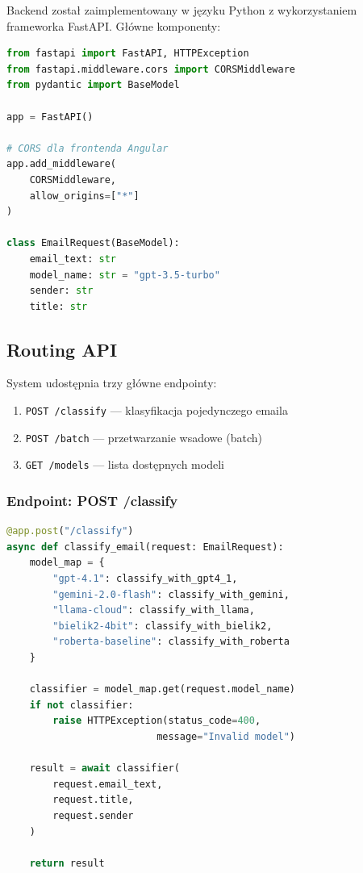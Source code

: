 \documentclass[11pt]{extreport}
\begin{document}
Backend został zaimplementowany w języku Python z wykorzystaniem frameworka FastAPI. Główne komponenty:

\begin{lstlisting}[language=Python, caption={Główny plik backendu}, label={lst:main}]
from fastapi import FastAPI, HTTPException
from fastapi.middleware.cors import CORSMiddleware
from pydantic import BaseModel

app = FastAPI()

# CORS dla frontenda Angular
app.add_middleware(
    CORSMiddleware, 
    allow_origins=["*"]
)

class EmailRequest(BaseModel):
    email_text: str
    model_name: str = "gpt-3.5-turbo"
    sender: str
    title: str
\end{lstlisting}

\subsection{Routing API}

System udostępnia trzy główne endpointy:

\begin{enumerate}
    \item \texttt{POST /classify} --- klasyfikacja pojedynczego emaila
    \item \texttt{POST /batch} --- przetwarzanie wsadowe (batch)
    \item \texttt{GET /models} --- lista dostępnych modeli
\end{enumerate}

\subsubsection{Endpoint: POST /classify}

\begin{lstlisting}[language=Python, caption={Endpoint klasyfikacji}, label={lst:classify}]
@app.post("/classify")
async def classify_email(request: EmailRequest):
    model_map = {
        "gpt-4.1": classify_with_gpt4_1,
        "gemini-2.0-flash": classify_with_gemini,
        "llama-cloud": classify_with_llama,
        "bielik2-4bit": classify_with_bielik2,
        "roberta-baseline": classify_with_roberta
    }
    
    classifier = model_map.get(request.model_name)
    if not classifier:
        raise HTTPException(status_code=400, 
                          message="Invalid model")
    
    result = await classifier(
        request.email_text,
        request.title,
        request.sender
    )
    
    return result
\end{lstlisting}
\end{document}
